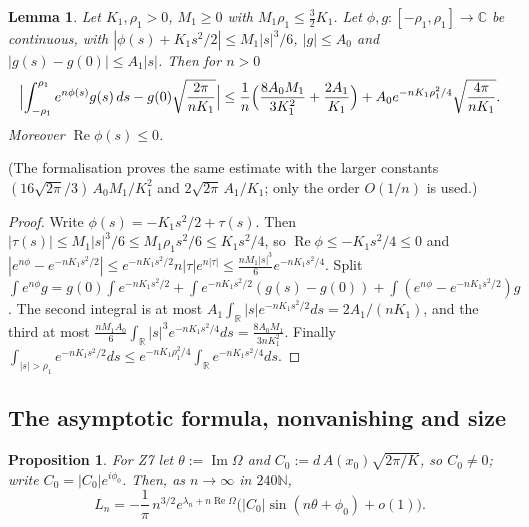 \documentclass[11pt]{amsart}
\newtheorem{proposition}[theorem]{Proposition}
\newtheorem{lemma}[theorem]{Lemma}
\theoremstyle{definition}
\theoremstyle{remark}
\numberwithin{equation}{section}
\newcommand{\NN}{\mathbb{N}}
\newcommand{\RR}{\mathbb{R}}
\newcommand{\CC}{\mathbb{C}}
\renewcommand{\Re}{\operatorname{Re}}
\renewcommand{\Im}{\operatorname{Im}}
\begin{document}
\begin{lemma}\label{lem:laplace}
Let $K_1,\rho_1>0$, $M_1\ge0$ with $M_1\rho_1\le\frac32K_1$. Let $\phi,g:[-\rho_1,\rho_1]\to\CC$ be continuous,
with $|\phi(s)+K_1s^2/2|\le M_1|s|^3/6$, $|g|\le A_0$ and $|g(s)-g(0)|\le A_1|s|$. Then for $n>0$
\[
  \Bigl|\int_{-\rho_1}^{\rho_1}e^{n\phi(s)}g(s)\,ds-g(0)\sqrt{\frac{2\pi}{nK_1}}\Bigr|
  \le\frac1n\Bigl(\frac{8A_0M_1}{3K_1^2}+\frac{2A_1}{K_1}\Bigr)+A_0e^{-nK_1\rho_1^2/4}\sqrt{\frac{4\pi}{nK_1}} .
\]
Moreover $\Re\phi(s)\le0$.
\end{lemma}

(The formalisation proves the same estimate with the larger constants $(16\sqrt{2\pi}/3)\,A_0M_1/K_1^2$ and
$2\sqrt{2\pi}\,A_1/K_1$; only the order $O(1/n)$ is used.)

\begin{proof}
Write $\phi(s)=-K_1s^2/2+\tau(s)$. Then $|\tau(s)|\le M_1|s|^3/6\le M_1\rho_1s^2/6\le K_1s^2/4$, so
$\Re\phi\le-K_1s^2/4\le0$ and
$|e^{n\phi}-e^{-nK_1s^2/2}|\le e^{-nK_1s^2/2}n|\tau|e^{n|\tau|}\le\frac{nM_1|s|^3}6e^{-nK_1s^2/4}$. Split
$\int e^{n\phi}g=g(0)\int e^{-nK_1s^2/2}+\int e^{-nK_1s^2/2}(g(s)-g(0))+\int(e^{n\phi}-e^{-nK_1s^2/2})g$. The second
integral is at most $A_1\int_\RR|s|e^{-nK_1s^2/2}ds=2A_1/(nK_1)$, and the third at most
$\frac{nM_1A_0}6\int_\RR|s|^3e^{-nK_1s^2/4}ds=\frac{8A_0M_1}{3nK_1^2}$. Finally
$\int_{|s|>\rho_1}e^{-nK_1s^2/2}ds\le e^{-nK_1\rho_1^2/4}\int_\RR e^{-nK_1s^2/4}ds$.
\end{proof}

\subsection{The asymptotic formula, nonvanishing and size}

\begin{proposition}\label{prop:asymp}
For Z7 let $\theta:=\Im\Omega$ and $C_0:=d\,A(x_0)\sqrt{2\pi/K}$, so $C_0\ne0$; write $C_0=|C_0|e^{i\phi_0}$. Then,
as $n\to\infty$ in $240\NN$,
\[
  L_n=-\frac1\pi\,n^{3/2}e^{\lambda_n+n\Re\Omega}\bigl(|C_0|\sin(n\theta+\phi_0)+o(1)\bigr).
\]
\end{proposition}
\end{document}
